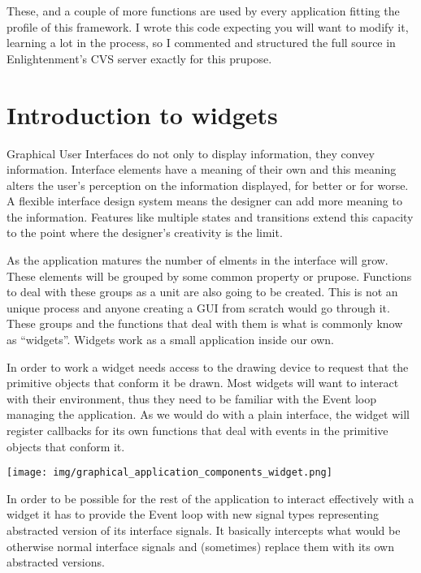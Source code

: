 \documentclass[12pt,a4paper,english]{book}
\begin{document}
These, and a couple of more functions are used by every application fitting the
profile of this framework. I wrote this code expecting you will want to modify
it, learning a lot in the process, so I commented and structured the full
source in Enlightenment's CVS server exactly for this prupose.



\hypertarget{introduction-to-widgets}{}
\chapter{Introduction to widgets}
\label{introduction-to-widgets}

Graphical User Interfaces do not only to display information, they convey
information. Interface elements have a meaning of their own and this meaning
alters the user's perception on the information displayed, for better or for
worse. A flexible interface design system means the designer can add more
meaning to the information. Features like multiple states and transitions
extend this capacity to the point where the designer's creativity is the limit.

As the application matures the number of elments in the interface will grow.
These elements will be grouped by some common property or prupose. Functions to
deal with these groups as a unit are also going to be created. This is not an
unique process and anyone creating a GUI from scratch would go through it.
These groups and the functions that deal with them is what is commonly know as
``widgets''. Widgets work as a small application inside our own.

In order to work a widget needs access to the drawing device to request that
the primitive objects that conform it be drawn. Most widgets will want to
interact with their environment, thus they need to be familiar with the Event
loop managing the application. As we would do with a plain interface, the
widget will register callbacks for its own functions that deal with events in
the primitive objects that conform it.

{\hfill\texttt{[image: img/graphical\_application\_components\_widget.png]}\hfill}

In order to be possible for the rest of the application to interact effectively
with a widget it has to provide the Event loop with new signal types
representing abstracted version of its interface signals. It basically
intercepts what would be otherwise normal interface signals and (sometimes)
replace them with its own abstracted versions.
\end{document}
